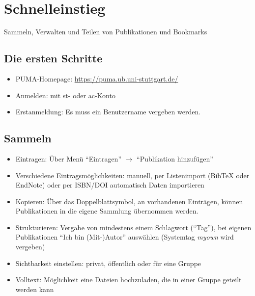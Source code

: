 \chapter{Schnelleinstieg}
\label{ch:schnelleinstieg}
Sammeln, Verwalten und Teilen von Publikationen und Bookmarks

\section{Die ersten Schritte}
\label{sec:ersteSchritte}
\begin{itemize}
\item PUMA-Homepage: \url{https://puma.ub.uni-stuttgart.de/}
\item Anmelden: mit st- oder ac-Konto
\item Erstanmeldung: Es muss ein Benutzername vergeben werden.
\end{itemize}

\section{Sammeln}
\label{sec:sammeln}
\begin{itemize}
\item Eintragen: Über Menü \enquote{Eintragen} $\to$ \enquote{Publikation hinzufügen}
\item Verschiedene Eintragsmöglichkeiten: manuell, per Listenimport (BibTeX oder EndNote) oder per ISBN/DOI automatisch Daten importieren
\item Kopieren: Über das Doppelblattsymbol, an vorhandenen Einträgen, können Publikationen in die eigene Sammlung übernommen werden. 
\item Strukturieren: Vergabe von mindestens einem Schlagwort (\enquote{Tag}), bei eigenen Publikationen \enquote{Ich bin (Mit-)Autor} auswählen (Systemtag \textit{myown} wird vergeben) 
\item Sichtbarkeit einstellen: privat, öffentlich oder für eine Gruppe
\item Volltext: Möglichkeit eine Dateien hochzuladen, die in einer Gruppe geteilt werden kann
\end{itemize}

